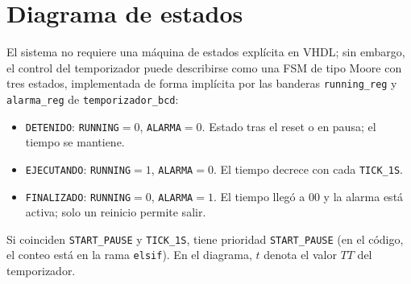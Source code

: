 \documentclass[letterpaper,12pt]{article}
\begin{document}
\section{Diagrama de estados}
El sistema no requiere una máquina de estados explícita en VHDL; sin embargo, el control del temporizador puede describirse como una FSM de tipo Moore con tres estados, implementada de forma implícita por las banderas \texttt{running\_reg} y \texttt{alarma\_reg} de \texttt{temporizador\_bcd}:
\begin{itemize}
    \item \texttt{DETENIDO}: \texttt{RUNNING}$=0$, \texttt{ALARMA}$=0$. Estado tras el reset o en pausa; el tiempo se mantiene.
    \item \texttt{EJECUTANDO}: \texttt{RUNNING}$=1$, \texttt{ALARMA}$=0$. El tiempo decrece con cada \texttt{TICK\_1S}.
    \item \texttt{FINALIZADO}: \texttt{RUNNING}$=0$, \texttt{ALARMA}$=1$. El tiempo llegó a 00 y la alarma está activa; solo un reinicio permite salir.
\end{itemize}
Si coinciden \texttt{START\_PAUSE} y \texttt{TICK\_1S}, tiene prioridad \texttt{START\_PAUSE} (en el código, el conteo está en la rama \texttt{elsif}). En el diagrama, $t$ denota el valor $TT$ del temporizador.
\end{document}
